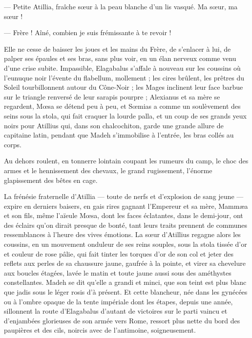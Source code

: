 \documentclass[a4paper, 11pt, oneside, polutonikogreek, french]{article}
\begin{document}
--- Petite Atillia, fraîche sœur à la peau blanche d'un lis vasqué. Ma sœur, ma sœur !

--- Frère ! Aîné, combien je suis frémissante à te revoir !

Elle ne cesse de baisser les joues et les mains du Frère, de s'enlacer à lui, de palper ses épaules et ses bras, sans plus voir, en un élan nerveux comme venu d'une crise subite. Impassible, Elagabalus s'affale à nouveau sur les coussins où l'eunuque noir l'évente du flabellum, mollement ; les cires brûlent, les prêtres du Soleil tourbillonnent autour du Cône-Noir ; les Mages inclinent leur face barbue sur le triangle renversé de leur sarapis pourpre ; Alexianus et sa mère se regardent, Mœsa se détend peu à peu, et Sœmias a comme un soulèvement des seins sous la stola, qui fait craquer la lourde palla, et un coup de ses grands yeux noirs pour Atillius qui, dans son chalcochiton, garde une grande allure de capitaine latin, pendant que Madeh s'immobilise à l'entrée, les bras collés au corps.

Au dehors roulent, en tonnerre lointain coupant les rumeurs du camp, le choc des armes et le hennissement des chevaux, le grand rugissement, l'énorme glapissement des bêtes en cage.

La frénésie fraternelle d'Atillia --- toute de nerfs et d'explosion de sang jeune --- expire en derniers baisers, en gais rires gagnant l'Empereur et sa mère, Mammæa et son fils, même l'aïeule Mœsa, dont les faces éclatantes, dans le demi-jour, ont des éclairs qu'on dirait presque de bonté, tant leurs traits prennent de communes ressemblances à l'heure des vives émotions. La sœur d'Atillius regagne alors les coussins, en un mouvement onduleur de ses reins souples, sous la stola tissée d'or et couleur de rose pâlie, qui fait tinter les torques d'or de son col et jeter des reflets aux perles de sa chaussure jaune, gaufrée à la pointe, et virer sa chevelure aux boucles étagées, lavée le matin et toute jaune aussi sous des améthystes constellantes. Madeh se dit qu'elle a grandi et minci, que son teint est plus blanc que jadis sous le léger rosis d'à présent. Et cette blancheur, née dans les gynécées ou à l'ombre opaque de la tente impériale dont les étapes, depuis une année, sillonnent la route d'Elagabalus d'autant de victoires sur le parti vaincu et d'enjambées glorieuses de son armée vers Rome, ressort plus nette du bord des paupières et des cils, noircis avec de l'antimoine, soigneusement.
\end{document}
